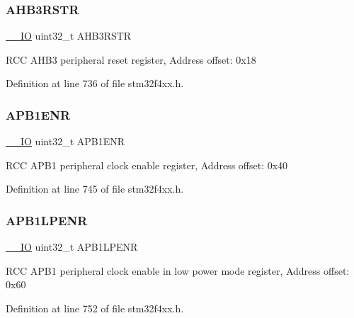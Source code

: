 \subsubsection{\texorpdfstring{A\+H\+B3\+R\+S\+TR}{AHB3RSTR}}
{\footnotesize\ttfamily \hyperlink{group___c_m_s_i_s__core__definitions_gaec43007d9998a0a0e01faede4133d6be}{\+\_\+\+\_\+\+IO} uint32\+\_\+t A\+H\+B3\+R\+S\+TR}

R\+CC A\+H\+B3 peripheral reset register, Address offset\+: 0x18 

Definition at line 736 of file stm32f4xx.\+h.

\mbox{\label{struct_r_c_c___type_def_ac88901e2eb35079b7b58a185e6bf554c}} 
\subsubsection{\texorpdfstring{A\+P\+B1\+E\+NR}{APB1ENR}}
{\footnotesize\ttfamily \hyperlink{group___c_m_s_i_s__core__definitions_gaec43007d9998a0a0e01faede4133d6be}{\+\_\+\+\_\+\+IO} uint32\+\_\+t A\+P\+B1\+E\+NR}

R\+CC A\+P\+B1 peripheral clock enable register, Address offset\+: 0x40 

Definition at line 745 of file stm32f4xx.\+h.

\mbox{\label{struct_r_c_c___type_def_ad85a9951a7be79fe08ffc90f796f071b}} 
\subsubsection{\texorpdfstring{A\+P\+B1\+L\+P\+E\+NR}{APB1LPENR}}
{\footnotesize\ttfamily \hyperlink{group___c_m_s_i_s__core__definitions_gaec43007d9998a0a0e01faede4133d6be}{\+\_\+\+\_\+\+IO} uint32\+\_\+t A\+P\+B1\+L\+P\+E\+NR}

R\+CC A\+P\+B1 peripheral clock enable in low power mode register, Address offset\+: 0x60 

Definition at line 752 of file stm32f4xx.\+h.

\mbox{\label{struct_r_c_c___type_def_a7da5d372374bc59e9b9af750b01d6a78}} 

